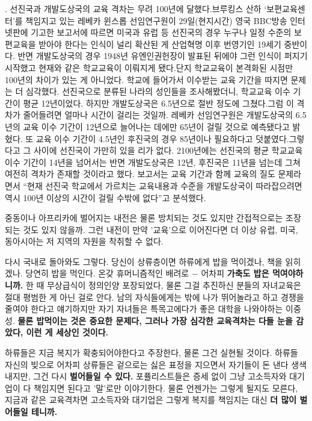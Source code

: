 . 선진국과 개발도상국의 교육 격차는 무려 100년에 달했다.브루킹스 산하 ‘보편교육센터’를 책임지고 있는 레베카 윈스롭 선임연구원이 29일(현지시간) 영국 BBC방송 인터넷판에 기고한 보고서에 따르면 미국과 유럽 등 선진국의 경우 누구나 일정 수준의 보편교육을 받아야 한다는 인식이 널리 확산된 게 산업혁명 이후 번영기인 19세기 중반이다. 반면 개발도상국의 경우 1948년 유엔인권헌장이 발표된 뒤에야 그런 인식이 퍼지기 시작했고 현재와 같은 학교교육이 이뤄지게 됐다.단지 학교교육이 본격화된 시점만 100년의 차이가 있는 게 아니었다. 학교에 들어가서 이수받는 교육 기간을 따지면 문제는 더 심각했다. 선진국으로 분류된 나라의 성인들을 조사해봤더니, 학교교육 이수 기간이 평균 12년이었다. 하지만 개발도상국은 6.5년으로 절반 정도에 그쳤다.그럼 이 격차가 줄어들려면 얼마나 시간이 걸리는 것일까. 레베카 선임연구원은 개발도상국의 6.5년의 교육 이수 기간이 12년으로 늘어나는 데에만 65년이 걸릴 것으로 예측됐다고 밝혔다. 또 교육 이수 기간이 4.5년인 후진국의 경우 85년이나 필요하다고 덧붙였다.그렇다고 그 사이에 선진국이 가만히 있을 리가 없다. 2100년에는 선진국의 평균 학교교육 이수 기간이 14년을 넘어서는 반면 개발도상국은 12년, 후진국은 11년을 넘는데 그쳐 여전히 격차가 존재할 것이라고 했다. 보고서는 교육 기간과 함께 교육의 질도 문제라면서 “현재 선진국 학교에서 가르치는 교육내용과 수준을 개발도상국이 따라잡으려면 역시 100년 이상의 시간이 걸릴 수밖에 없다”고 분석했다.
\vspace{5mm}

중동이나 아프리카에 벌어지는 내전은 물론 방치되는 것도 있지만 간접적으로는 조장되는 것도 있지 않을까.
그런 내전이 만약 '교육'으로 이어진다면 더 이상 유럽, 미국, 동아시아는 저 지역의 자원을 착취할 수 없다.
\vspace{5mm}

다시 국내로 돌아와도 그렇다.
당신이 상류층이면 하류에게 밥을 먹이겠나, 책을 읽히겠나.
당연히 밥을 먹인다. 온갖 휴머니즘적인 배려로 $-$ 어차피 \textbf{가축도 밥은 먹여야하니까.}
한 때 무상급식이 정의인양 포장되었다,
물론 그걸 추진하신 분들의 자녀교육은 절대 평범한 게 아닌 걸로 안다.
남의 자식들에게는 밖에 나가 뛰어놀라고 하고 경쟁을 줄여야 한다고 얘기하지만
자기 자녀들은 특목고에다가 좋은 대학을 나와야하는 이중성.
\textbf{물론 밥먹이는 것은 중요한 문제다, 그러나 가장 심각한 교육격차는 다들 눈을 감았다, 이런 게 세상인 것이다.}
\vspace{5mm}

하류들은 지금 복지가 확충되어야한다고 주장한다, 물론 그건 실현될 것이다. 하류들 자신의 빚으로
어차피 상류들은 겉으로는 싫은 표정을 지으면서 자기들이 돈 낸다 생색내지만, 그건 다시 \textbf{벌어들일 수 있다.}
포퓰리스트들은 증세 없이 그냥 고소득자와 대기업이 다 책임지면 된다고 '말'로만 이야기한다.
물론 언젠가는 그렇게 될지도 모른다, 지금과 같은 교육격차면
고소득자와 대기업은 그렇게 복지를 책임지는 대신 \textbf{더 많이 벌어들일 테니까.}
\vspace{5mm}

